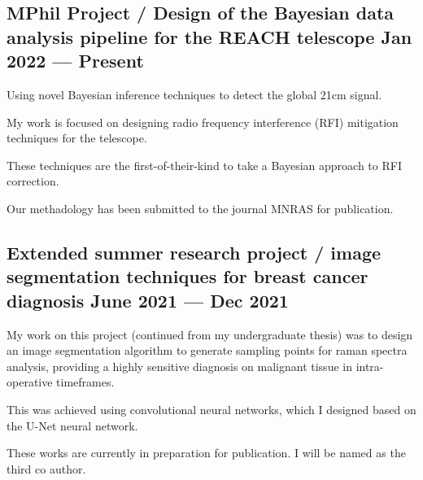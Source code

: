 \subsection{{MPhil Project / Design of the Bayesian data analysis pipeline for the REACH telescope \hfill Jan 2022 --- Present}}
\begin{zitemize}
\item Using novel Bayesian inference techniques to detect the global 21cm signal.
\item My work is focused on designing radio frequency interference (RFI) mitigation techniques for the telescope.
\item These techniques are the first-of-their-kind to take a Bayesian approach to RFI correction.
\item Our methadology has been submitted to the journal MNRAS for publication.
\end{zitemize}

\subsection{{Extended summer research project / image segmentation techniques for breast cancer diagnosis \hfill June 2021 --- Dec 2021}}
\begin{zitemize}
\item My work on this project (continued from my undergraduate thesis) was to design an image segmentation algorithm to generate sampling points for raman spectra analysis, providing a highly sensitive diagnosis on malignant tissue in intra-operative timeframes.
\item This was achieved using convolutional neural networks, which I designed based on the U-Net neural network.
\item These works are currently in preparation for publication. I will be named as the third co author.
\end{zitemize}

